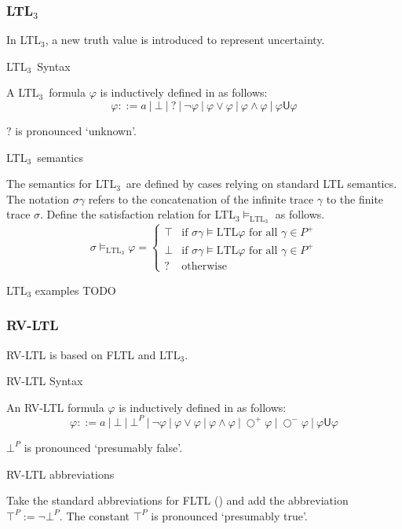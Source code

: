 \documentclass[a4paper]{article}
\newcommand{\U}{\mathsf{U}}
\newcommand{\fall}{\text{ for all }}
\newcommand{\sn}{\bigcirc^+}
\newcommand{\wn}{\bigcirc^-}
\newcommand{\ltlt}{LTL$_3$}
\begin{document}
\subsubsection{\ltlt} In \ltlt, a new truth value is introduced to represent uncertainty.

\begin{defn}{\ltlt\ Syntax}

  A \ltlt\ formula $\varphi$ is inductively defined in as follows:
  \[\varphi ::= a ~|~ \bot ~|~ ? ~|~ \neg \varphi ~|~\varphi \lor \varphi ~|~ \varphi \land \varphi ~|~ \varphi \U\varphi\]

  $?$ is pronounced `unknown'.
\end{defn}
\begin{defn}{\ltlt\ semantics}

  The semantics for \ltlt\ are defined by cases relying on standard LTL semantics. The notation $\sigma\gamma$ refers to the concatenation of the infinite trace $\gamma$ to the finite trace $\sigma$.
  Define the satisfaction relation for \ltlt $\vDash_{\text{\ltlt}}$ as follows.
  \[\sigma\vDash_{\text{\ltlt}}\varphi =
    \begin{cases}
      \top & \text{if } \sigma\gamma \vDash{\text{LTL}} \varphi \fall \gamma \in P^+\\
      \bot & \text{if } \sigma\gamma \vDash{\text{LTL}} \varphi \fall \gamma \in P^+\\
      ? & \text{otherwise}
    \end{cases}
    \]
\end{defn}

\begin{eg}{LTL$_3$ examples}
  TODO
\end{eg}

\subsubsection{RV-LTL} RV-LTL is based on FLTL and \ltlt.
\begin{defn}{RV-LTL Syntax}

  An RV-LTL formula $\varphi$ is inductively defined in as follows:
  \[\varphi ::= a ~|~ \bot ~|~ \bot^P ~|~ \neg \varphi ~|~\varphi \lor \varphi ~|~ \varphi \land \varphi ~|~ \sn \varphi ~|~ \wn \varphi ~|~ \varphi \U\varphi\]

  $\bot^P$ is pronounced `presumably false'.
\end{defn}

\begin{notn}{RV-LTL abbreviations}

  Take the standard abbreviations for FLTL () and add the abbreviation $\top^P := \neg \bot^P$. The constant $\top^P$ is pronounced `presumably true'.
\end{notn}
\end{document}

